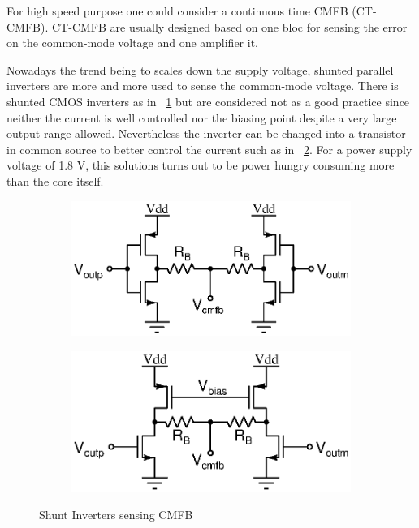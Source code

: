 For high speed purpose one could consider a continuous time CMFB (CT-CMFB). CT-CMFB are usually designed based on one bloc for sensing the error on the common-mode voltage and one amplifier it.

Nowadays the trend being to scales down the supply voltage, shunted parallel inverters are more and more used to sense the common-mode voltage. There is shunted CMOS inverters as in \figurename~\ref{fig:shunt_cmos_cmfb}\cite{} but are considered not as a good practice since neither the current is well controlled nor the biasing point despite a very large output range allowed. Nevertheless the inverter can be changed into a transistor in common source to better control the current such as in \figurename~\ref{fig:shunt_inverter_cmfb}\cite{Carillo2007,Carillo2010,Centurelli2017}. For a power supply voltage of 1.8 V, this solutions turns out to be power hungry consuming more than the core itself.

\begin{figure}[htp]
    \centering
    \begin{subfigure}[b]{0.48\textwidth}
        \includegraphics[width=\textwidth]{Chapter7/Figs/shunt_cmos_cmfb.ps}
        \label{fig:shunt_cmos_cmfb}
    \end{subfigure}
    \begin{subfigure}[b]{0.48\textwidth}
        \includegraphics[width=\textwidth]{Chapter7/Figs/shunt_inverter_cmfb.ps}
        \label{fig:shunt_inverter_cmfb}
    \end{subfigure}
    \caption{Shunt Inverters sensing CMFB}
    \label{fig:shunt_inverter_sensing}
\end{figure}

